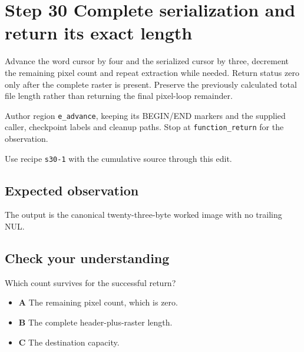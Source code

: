 \section{Step 30 Complete serialization and return its exact length}\label{ppm-s30}

Advance the word cursor by four and the serialized cursor by three, decrement the remaining pixel count and repeat extraction while needed. Return status zero only after the complete raster is present. Preserve the previously calculated total file length rather than returning the final pixel-loop remainder.

Author region \texttt{e\_advance}, keeping its BEGIN/END markers and the supplied caller, checkpoint labels and cleanup paths. Stop at \texttt{function\_return} for the observation.

Use recipe \texttt{s30-1} with the cumulative source through this edit.

\subsection{Expected observation}
The output is the canonical twenty-three-byte worked image with no trailing NUL.

\subsection{Check your understanding}
Which count survives for the successful return?

\begin{itemize}
  \item \textbf{A} The remaining pixel count, which is zero.
  \item \textbf{B} The complete header-plus-raster length.
  \item \textbf{C} The destination capacity.
\end{itemize}
